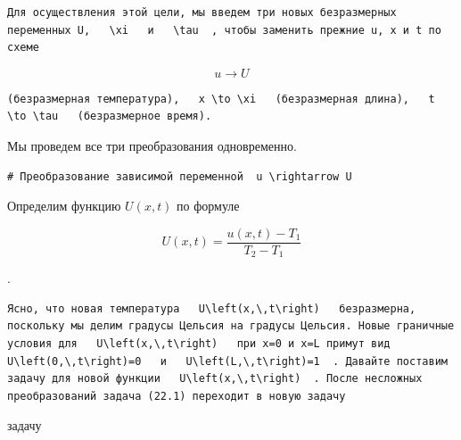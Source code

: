 \documentclass[
  ukrainian,
]{article}
\begin{document}
\begin{verbatim}
Для осуществления этой цели, мы введем три новых безразмерных переменных U,   \xi   и   \tau  , чтобы заменить прежние u, x и t по схеме
\end{verbatim}

\[
u \to U
\]

\begin{verbatim}
(безразмерная температура),   x \to \xi   (безразмерная длина),   t \to \tau   (безразмерное время).
\end{verbatim}

Мы проведем все три преобразования одновременно.

\begin{verbatim}
# Преобразование зависимой переменной  u \rightarrow U
\end{verbatim}

Определим функцию \(U(x, t)\) по формуле

\[
U(x, t) = \frac{u(x, t) - T_1}{T_2 - T_1}
\]

.

\begin{verbatim}
Ясно, что новая температура   U\left(x,\,t\right)   безразмерна, поскольку мы делим градусы Цельсия на градусы Цельсия. Новые граничные условия для   U\left(x,\,t\right)   при x=0 и x=L примут вид   U\left(0,\,t\right)=0   и   U\left(L,\,t\right)=1  . Давайте поставим задачу для новой функции   U\left(x,\,t\right)  . После несложных преобразований задача (22.1) переходит в новую задачу
\end{verbatim}

задачу
\end{document}
